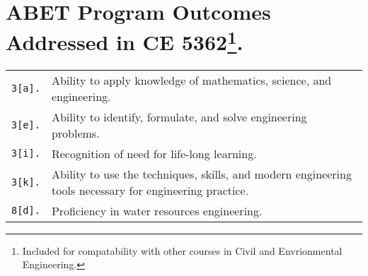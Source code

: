 \documentclass[12pt]{article}
\begin{document}
\section*{\small{ABET Program Outcomes Addressed in CE 5362}\footnote{Included for compatability with other courses in Civil and Envrionmental Engineering.}.}
\begin{tabular}{p{0.5in}p{5.5in}}
\texttt{3[a].}  & Ability to apply knowledge of mathematics, science, and engineering.\\
\texttt{3[e].}  & Ability to identify, formulate, and solve engineering problems.\\
\texttt{3[i].}   & Recognition of need for life-long learning.\\
\texttt{3[k].}  & Ability to use the techniques, skills, and modern engineering tools necessary for engineering practice.\\
\texttt{8[d].}  & Proficiency in water resources engineering.\\
\end{tabular}
\end{document}
